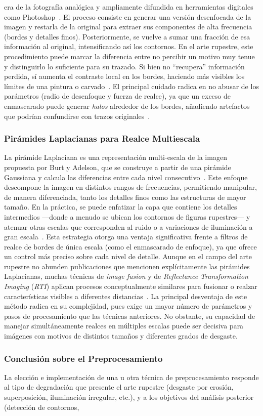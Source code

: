 era de la fotografía analógica y ampliamente difundida en herramientas digitales como Photoshop~\cite{adobe_unsharp_masking}. El proceso consiste en generar una versión desenfocada de la imagen y restarla de la original para extraer sus componentes de alta frecuencia (bordes y detalles finos). Posteriormente, se vuelve a sumar una fracción de esa información al original, intensificando así los contornos. En el arte rupestre, este procedimiento puede marcar la diferencia entre no percibir un motivo muy tenue y distinguirlo lo suficiente para su trazado. Si bien no “recupera” información perdida, sí aumenta el contraste local en los bordes, haciendo más visibles los límites de una pintura o carvado~\cite{xiao2020}. El principal cuidado radica en no abusar de los parámetros (radio de desenfoque y fuerza de realce), ya que un exceso de enmascarado puede generar \textit{halos} alrededor de los bordes, añadiendo artefactos que podrían confundirse con trazos originales~\cite{adobe_unsharp_masking}. \subsubsection{Pirámides Laplacianas para Realce Multiescala} La pirámide Laplaciana es una representación multi-escala de la imagen propuesta por Burt y Adelson, que se construye a partir de una pirámide Gaussiana y calcula las diferencias entre cada nivel consecutivo~\cite{bai2023,zhou2019}. Este enfoque descompone la imagen en distintos rangos de frecuencias, permitiendo manipular, de manera diferenciada, tanto los detalles finos como las estructuras de mayor tamaño. En la práctica, se puede enfatizar la capa que contiene los detalles intermedios —donde a menudo se ubican los contornos de figuras rupestres— y atenuar otras escalas que corresponden al ruido o a variaciones de iluminación a gran escala~\cite{paris2008}. Esta estrategia otorga una ventaja significativa frente a filtros de realce de bordes de única escala (como el enmascarado de enfoque), ya que ofrece un control más preciso sobre cada nivel de detalle. Aunque en el campo del arte rupestre no abunden publicaciones que mencionen explícitamente las pirámides Laplacianas, muchas técnicas de \textit{image fusion} y de \textit{Reflectance Transformation Imaging} (\textit{RTI}) aplican procesos conceptualmente similares para fusionar o realzar características visibles a diferentes distancias~\cite{zhou2019}. La principal desventaja de este método radica en su complejidad, pues exige un mayor número de parámetros y pasos de procesamiento que las técnicas anteriores. No obstante, su capacidad de manejar simultáneamente realces en múltiples escalas puede ser decisiva para imágenes con motivos de distintos tamaños y diferentes grados de desgaste. \subsubsection*{Conclusión sobre el Preprocesamiento} La elección e implementación de una u otra técnica de preprocesamiento responde al tipo de degradación que presente el arte rupestre (desgaste por erosión, superposición, iluminación irregular, etc.), y a los objetivos del análisis posterior (detección de contornos, 
